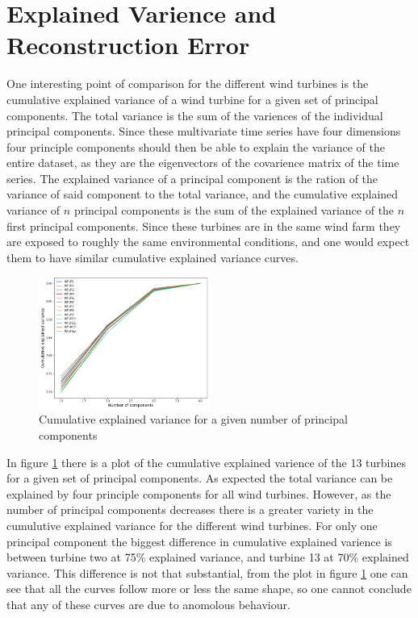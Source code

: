 \section{Explained Varience and Reconstruction Error}

One interesting point of comparison for the different wind turbines is the cumulative explained variance of a wind turbine for a given set of principal components. 
The total variance is the sum of the variences of the individual principal components. 
Since these multivariate time series have four dimensions four principle components should then be able to explain the variance of the entire dataset, as they are the eigenvectors of the covarience matrix of the time series. 
The explained variance of a principal component is the ration of the variance of said component to the total variance, and the cumulative explained variance of $n$ principal components is the sum of the explained variance of the $n$ first principal components. Since these turbines are in the same wind farm they are exposed to roughly the same environmental conditions, and one would expect them to have similar cumulative explained variance curves.

\begin{figure}[h]
    \begin{center}
    \includegraphics[width=0.5\textwidth]{data_exp/cumulative_explained_variance}
    \end{center}
    \caption{Cumulative explained variance for a given number of principal components} 
    \label{fig:cum_exp_var}
\end{figure}

In figure \ref{fig:cum_exp_var} there is a plot of the cumulative explained varience of the 13 turbines for a given set of principal components. 
As expected the total variance can be explained by four principle components for all wind turbines. 
However, as the number of principal components decreases there is a greater variety in the cumulutive explained variance for the different wind turbines. 
For only one principal component the biggest difference in cumulative explained varience is between turbine two at 75$\%$ explained variance, and turbine 13 at 70$\%$ explained variance.
This difference is not that substantial, from the plot in figure \ref{fig:cum_exp_var} one can see that all the curves follow more or less the same shape, so one cannot conclude that any of these curves are due to anomolous behaviour. \smallskip

